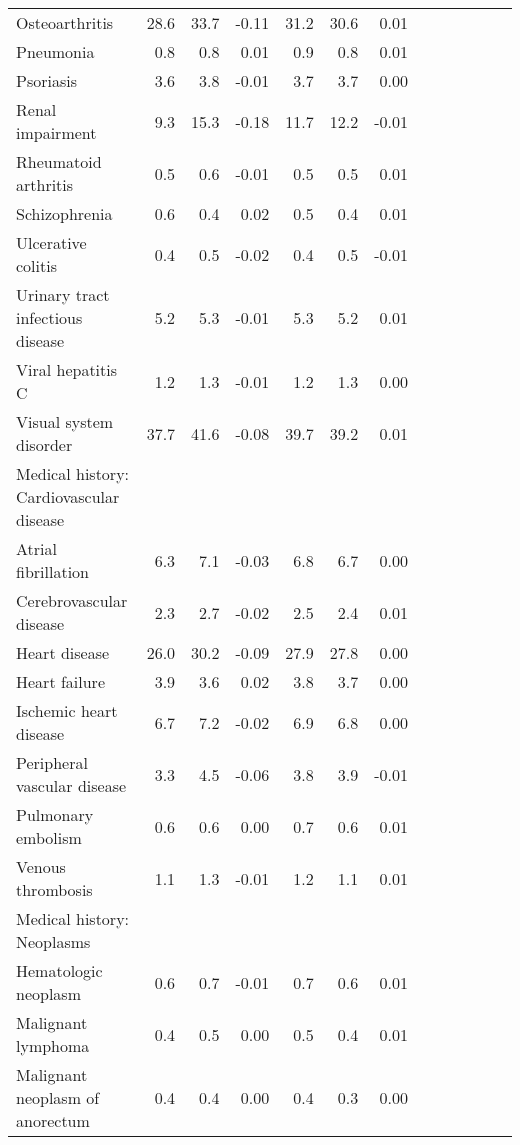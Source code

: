 \documentclass[11pt,]{article}
\begin{document}
\begin{longtable}{lrrrrrrrrrrrr}
      Osteoarthritis & 28.6 &  33.7 & -0.11 & 31.2 & 30.6 &  0.01 \\ 
      Pneumonia &  0.8 &   0.8 &  0.01 &  0.9 &  0.8 &  0.01 \\ 
      Psoriasis &  3.6 &   3.8 & -0.01 &  3.7 &  3.7 &  0.00 \\ 
      Renal impairment &  9.3 &  15.3 & -0.18 & 11.7 & 12.2 & -0.01 \\ 
      Rheumatoid arthritis &  0.5 &   0.6 & -0.01 &  0.5 &  0.5 &  0.01 \\ 
      Schizophrenia &  0.6 &   0.4 &  0.02 &  0.5 &  0.4 &  0.01 \\ 
      Ulcerative colitis &  0.4 &   0.5 & -0.02 &  0.4 &  0.5 & -0.01 \\ 
      Urinary tract infectious disease &  5.2 &   5.3 & -0.01 &  5.3 &  5.2 &  0.01 \\ 
      Viral hepatitis C &  1.2 &   1.3 & -0.01 &  1.2 &  1.3 &  0.00 \\ 
      Visual system disorder & 37.7 &  41.6 & -0.08 & 39.7 & 39.2 &  0.01 \\ 
  Medical history: Cardiovascular disease &    &     &     &    &    &     \\ 
      Atrial fibrillation &  6.3 &   7.1 & -0.03 &  6.8 &  6.7 &  0.00 \\ 
      Cerebrovascular disease &  2.3 &   2.7 & -0.02 &  2.5 &  2.4 &  0.01 \\ 
      Heart disease & 26.0 &  30.2 & -0.09 & 27.9 & 27.8 &  0.00 \\ 
      Heart failure &  3.9 &   3.6 &  0.02 &  3.8 &  3.7 &  0.00 \\ 
      Ischemic heart disease &  6.7 &   7.2 & -0.02 &  6.9 &  6.8 &  0.00 \\ 
      Peripheral vascular disease &  3.3 &   4.5 & -0.06 &  3.8 &  3.9 & -0.01 \\ 
      Pulmonary embolism &  0.6 &   0.6 &  0.00 &  0.7 &  0.6 &  0.01 \\ 
      Venous thrombosis &  1.1 &   1.3 & -0.01 &  1.2 &  1.1 &  0.01 \\ 
  Medical history: Neoplasms &    &     &     &    &    &     \\ 
      Hematologic neoplasm &  0.6 &   0.7 & -0.01 &  0.7 &  0.6 &  0.01 \\ 
      Malignant lymphoma &  0.4 &   0.5 &  0.00 &  0.5 &  0.4 &  0.01 \\ 
      Malignant neoplasm of anorectum &  0.4 &   0.4 &  0.00 &  0.4 &  0.3 &  0.00 \\ 

\end{longtable}
\end{document}

